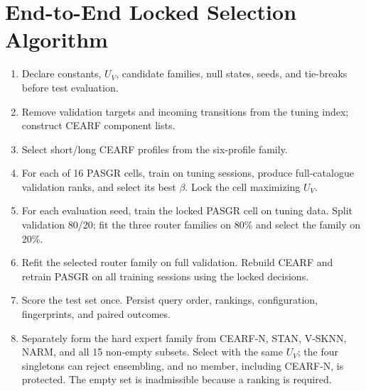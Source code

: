 \documentclass[runningheads]{llncs}
\newcommand{\method}{CEARF-N}
\begin{document}
\section{End-to-End Locked Selection Algorithm}
\begin{enumerate}
\item Declare constants, $U_V$, candidate families, null states, seeds, and
      tie-breaks before test evaluation.
\item Remove validation targets and incoming transitions from the tuning
      index; construct CEARF component lists.
\item Select short/long CEARF profiles from the six-profile family.
\item For each of 16 PASGR cells, train on tuning sessions, produce
      full-catalogue validation ranks, and select its best $\beta$. Lock the
      cell maximizing $U_V$.
\item For each evaluation seed, train the locked PASGR cell on tuning data.
      Split validation 80/20; fit the three router families on 80\% and select
      the family on 20\%.
\item Refit the selected router family on full validation. Rebuild CEARF and
      retrain PASGR on all training sessions using the locked decisions.
\item Score the test set once. Persist query order, rankings, configuration,
      fingerprints, and paired outcomes.
\item Separately form the hard expert family from \method{}, STAN, V-SKNN,
      NARM, and all 15 non-empty subsets. Select with the same $U_V$; the four
      singletons can reject ensembling, and no member, including \method{}, is
      protected. The empty set is inadmissible because a ranking is required.
\end{enumerate}
\end{document}
